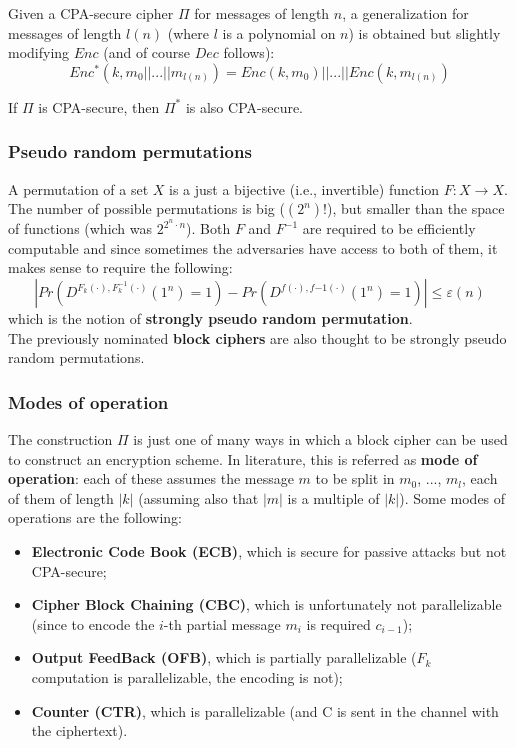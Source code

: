 \documentclass[../main]{subfiles}
\begin{document}
\begin{definition}
    Given a CPA-secure cipher $\Pi$ for messages of length $n$, a generalization for messages of length $l(n)$ (where $l$ is a polynomial on $n$) is obtained but slightly modifying $Enc$ (and of course $Dec$ follows):
    $$Enc^*(k, m_0 || ... || m_{l(n)}) = Enc(k,m_0) || ... || Enc(k,m_{l(n)})$$
\end{definition}

\begin{theorem}
    If $\Pi$ is CPA-secure, then $\Pi^*$ is also CPA-secure.
\end{theorem}


\subsubsection{Pseudo random permutations}
A permutation of a set $X$ is a just a bijective (i.e., invertible) function $F: X \rightarrow{} X$.
The number of possible permutations is big ($(2^n)!$), but smaller than the space of functions (which was $2^{2^n \cdot{} n}$).
Both $F$ and $F^{-1}$ are required to be efficiently computable and since sometimes the adversaries have access to both of them, it makes sense to require the following:
$$|Pr(D^{F_k(\cdot),F^{-1}_k(\cdot)}(1^n)=1)-Pr(D^{f(\cdot),f{-1}(\cdot)}(1^n)=1)| \le{} \varepsilon(n)$$
which is the notion of \textbf{strongly pseudo random permutation}.\\
\noindent
The previously nominated \textbf{block ciphers} are also thought to be strongly pseudo random permutations.

\subsubsection{Modes of operation}
The construction $\Pi$ is just one of many ways in which a block cipher can be used to construct an encryption scheme.
In literature, this is referred as \textbf{mode of operation}: each of these assumes the message $m$ to be split in $m_0$, ..., $m_l$, each of them of length $|k|$ (assuming also that $|m|$ is a multiple of $|k|$).
Some modes of operations are the following:
\begin{itemize}
    \item \textbf{Electronic Code Book (ECB)}, which is secure for passive attacks but not CPA-secure;
    \item \textbf{Cipher Block Chaining (CBC)}, which is unfortunately not parallelizable (since to encode the $i$-th partial message $m_i$ is required $c_{i-1}$);
    \item \textbf{Output FeedBack (OFB)}, which is partially parallelizable ($F_k$ computation is parallelizable, the encoding is not);
    \item \textbf{Counter (CTR)}, which is parallelizable (and C is sent in the channel with the ciphertext).
\end{itemize}
\end{document}

